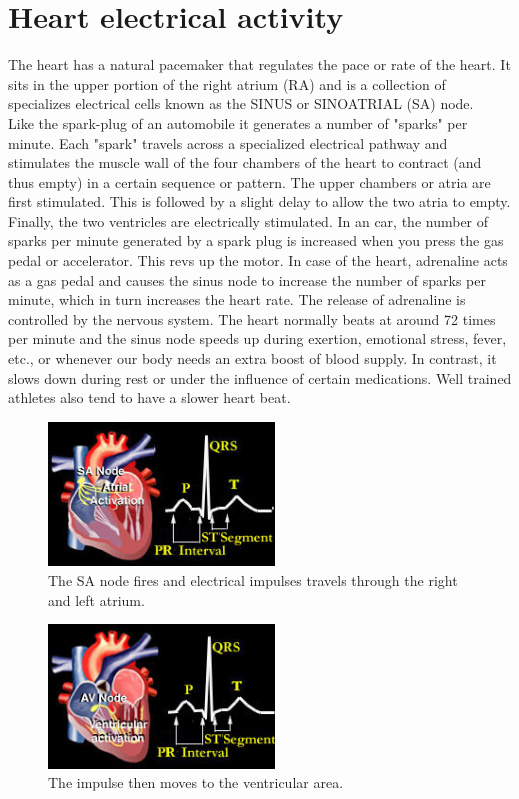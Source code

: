 \section{Heart electrical activity}
The heart has a natural pacemaker that regulates the pace or rate of the heart. It sits in the upper portion of the right atrium (RA) and is a collection of specializes electrical cells known as the SINUS or SINOATRIAL (SA) node.\\
Like the spark-plug of an automobile it generates a number of "sparks" per minute. Each "spark" travels across a specialized electrical pathway and stimulates the muscle wall of the four chambers of the heart to contract (and thus empty) in a certain sequence or pattern. The upper chambers or atria are first stimulated. This is followed by a slight delay to allow the two atria to empty. Finally, the two ventricles are electrically stimulated. In an car, the number of sparks per minute generated by a spark plug is increased when you press the gas pedal or accelerator. This revs up the motor. In case of the heart, adrenaline acts as a gas pedal and causes the sinus node to increase the number of sparks per minute, which in turn increases the heart rate. The release of adrenaline is controlled by the nervous system. The heart normally beats at around 72 times per minute and the sinus node speeds up during exertion, emotional stress, fever, etc., or whenever our body needs an extra boost of blood supply. In contrast, it slows down during rest or under the influence of certain medications. Well trained athletes also tend to have a slower heart beat.\\

\begin{figure}[ht!]
	\centering
	\includegraphics[width=60mm]{figures/ch2/3.png}
	\caption{The SA node fires and electrical impulses travels through the right and left atrium. \label{overflow}}
	\label{fig2.3}
\end{figure}
\begin{figure}[ht!]
	\centering
	\includegraphics[width=60mm]{figures/ch2/4.png}
	\caption{The impulse then moves to the ventricular area.}
	\label{fig2.4}
\end{figure}

